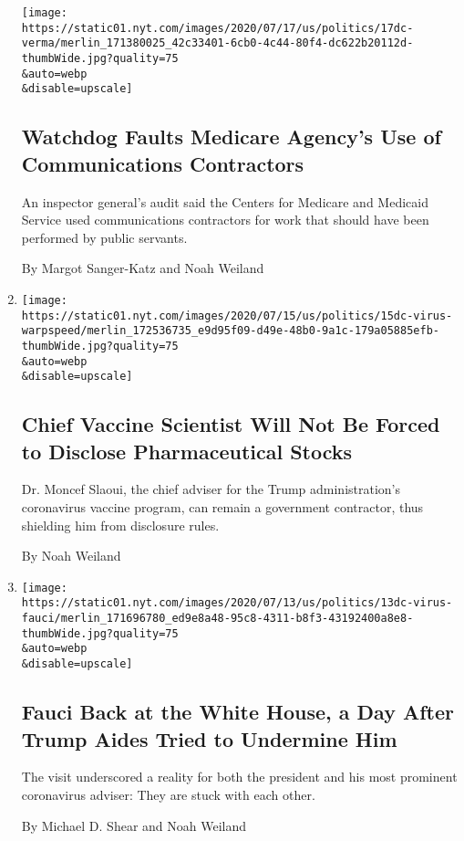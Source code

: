 \begin{enumerate}
  \texttt{[image: https://static01.nyt.com/images/2020/07/17/us/politics/17dc-verma/merlin\_171380025\_42c33401-6cb0-4c44-80f4-dc622b20112d-thumbWide.jpg?quality=75\\\&auto=webp\\\&disable=upscale]}

  \hypertarget{watchdog-faults-medicare-agencys-use-of-communications-contractors}{%
  \subsection{Watchdog Faults Medicare Agency's Use of Communications
  Contractors}\label{watchdog-faults-medicare-agencys-use-of-communications-contractors}}

  An inspector general's audit said the Centers for Medicare and
  Medicaid Service used communications contractors for work that should
  have been performed by public servants.

  By Margot Sanger-Katz and Noah Weiland
\item
  \href{/2020/07/15/us/politics/vaccine-Slaoui-coronavirus-trump.html}{}

  \texttt{[image: https://static01.nyt.com/images/2020/07/15/us/politics/15dc-virus-warpspeed/merlin\_172536735\_e9d95f09-d49e-48b0-9a1c-179a05885efb-thumbWide.jpg?quality=75\\\&auto=webp\\\&disable=upscale]}

  \hypertarget{chief-vaccine-scientist-will-not-be-forced-to-disclose-pharmaceutical-stocks}{%
  \subsection{Chief Vaccine Scientist Will Not Be Forced to Disclose
  Pharmaceutical
  Stocks}\label{chief-vaccine-scientist-will-not-be-forced-to-disclose-pharmaceutical-stocks}}

  Dr. Moncef Slaoui, the chief adviser for the Trump administration's
  coronavirus vaccine program, can remain a government contractor, thus
  shielding him from disclosure rules.

  By Noah Weiland
\item
  \href{/2020/07/13/us/politics/fauci-trump-coronavirus.html}{}

  \texttt{[image: https://static01.nyt.com/images/2020/07/13/us/politics/13dc-virus-fauci/merlin\_171696780\_ed9e8a48-95c8-4311-b8f3-43192400a8e8-thumbWide.jpg?quality=75\\\&auto=webp\\\&disable=upscale]}

  \hypertarget{fauci-back-at-the-white-house-a-day-after-trump-aides-tried-to-undermine-him}{%
  \subsection{Fauci Back at the White House, a Day After Trump Aides
  Tried to Undermine
  Him}\label{fauci-back-at-the-white-house-a-day-after-trump-aides-tried-to-undermine-him}}

  The visit underscored a reality for both the president and his most
  prominent coronavirus adviser: They are stuck with each other.

  By Michael D. Shear and Noah Weiland
\end{enumerate}

